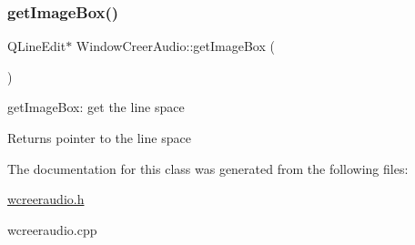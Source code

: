 \subsubsection{\texorpdfstring{get\+Image\+Box()}{getImageBox()}}
{\footnotesize\ttfamily Q\+Line\+Edit$\ast$ Window\+Creer\+Audio\+::get\+Image\+Box (\begin{DoxyParamCaption}{ }\end{DoxyParamCaption})\hspace{0.3cm}{\ttfamily [inline]}}



get\+Image\+Box\+: get the line space 

\begin{DoxyReturn}{Returns}
pointer to the line space 
\end{DoxyReturn}


The documentation for this class was generated from the following files\+:\begin{DoxyCompactItemize}
\item 
\hyperlink{wcreeraudio_8h}{wcreeraudio.\+h}\item 
wcreeraudio.\+cpp\end{DoxyCompactItemize}
